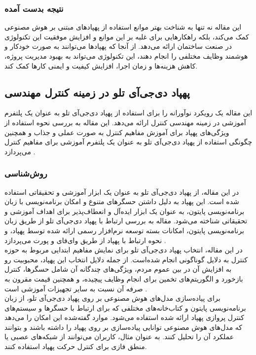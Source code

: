 \subsubsection{نتیجه بدست آمده}
این مقاله نه تنها به شناخت بهتر موانع استفاده از پهپادهای مبتنی بر هوش مصنوعی کمک می‌کند، بلکه راهکارهایی برای غلبه بر این موانع و افزایش موفقیت این تکنولوژی در صنعت ساختمان ارائه می‌دهد. از آنجا که
پهپادها می‌توانند به صورت خودکار و هوشمند وظایف مختلفی را انجام دهند، این تکنولوژی می‌تواند به بهبود مدیریت پروژه، کاهش هزینه‌ها و زمان اجرا، افزایش کیفیت و ایمنی کارها کمک کند.


\subsection { پهپاد دی‌جی‌آی تلو در زمینه کنترل مهندسی}
این مقاله یک رویکرد نوآورانه را برای استفاده از پهپاد دی‌جی‌آی تلو  به عنوان یک پلتفرم آموزشی در زمینه مهندسی کنترل ارائه می‌دهد. این مقاله به بررسی نحوه استفاده از ویژگی‌های پهپاد برای 
آموزش مفاهیم کنترل به صورت عملی و جذاب و همچنین چگونگی استفاده از پهپاد دی‌جی‌آی تلو به عنوان یک پلتفرم آموزشی برای مفاهیم کنترل می‌پردازد \cite{ghazi2023use}.

\subsubsection{روش‌شناسی}
در این مقاله، از پهپاد دی‌جی‌آی تلو به عنوان یک ابزار آموزشی و تحقیقاتی استفاده شده است. این پهپاد به دلیل داشتن حسگرهای متنوع و امکان برنامه‌نویسی با زبان برنامه‌نویسی پایتون، به عنوان یک 
ابزار ایده‌آل و انعطاف‌پذیر برای اهداف آموزشی و تحقیقاتی شناخته می‌شود. مقاله به بررسی ارتباط با پهپاد دی‌جی‌آی تلو از طریق زبان برنامه‌نویسی پایتون، امکانات  بسته توسعه نرم‌افزار
 رسمی ارائه شده توسط پهپاد، و نحوه ارتباط با پهپاد از طریق وای‌فای و پورت  می‌پردازد .
\\
در این مقاله، انتخاب پهپاد دی‌جی‌آی تلو برای نمایش مفاهیم ابتدایی مربوط به حوزه کنترل به دلایل گوناگونی انجام شده‌است. از جمله دلایل انتخاب این پهپاد، محبوبیت رو به افزایش آن در بین عموم مردم،
ویژگی‌های چندگانه آن شامل حسگرها، کنترل بازخورد و الگوریتم‌های تخمین برای انجام وظایف پیچیده، و همچنین قیمت مقرون به صرفه آن نسبت به سایر تجهیزات آموزشی است .
\\
برای پیاده‌سازی مدل‌های هوش مصنوعی بر روی پهپاد دی‌جی‌آی تلو، از زبان برنامه‌نویسی پایتون و کتاب‌خانه‌های مختلفی که برای ارتباط با حسگرها و سیستم‌های کنترل پروازی پهپاد ارائه شده استفاده می‌شود. موارد گفته‌شده این 
امکان را می‌دهد که مدل‌های هوش مصنوعی توانایی پیاده‌سازی بر روی پهپاد را داشته باشند و بتوانند عملکرد آن‌ را تحلیل کنند. به عنوان مثال، کاربران می‌توانند از شبکه‌های عصبی یا منطق فازی برای کنترل حرکت پهپاد استفاده کنند.

